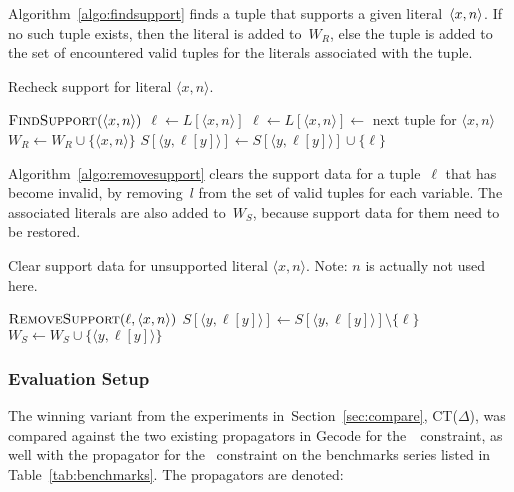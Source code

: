 \documentclass[a4paper,11pt]{article}
\newcommand{\Secref}[1]{Section~\ref{#1}}
\newcommand{\Algoref}[1]{Algorithm~\ref{#1}}
\newcommand{\Table}{\Constraint{Table}}
\newcommand{\Regular}{\Constraint{Regular}}
\newcommand{\FOREACH}[1]{\FORALL{{#1} \textbf{do}}}
\newcommand{\ENDFOREACH}{\ENDFOR}
\def\PROCEDURE{\item[\textbf{PROCEDURE}]}
\def\FindSupport{\textsc{FindSupport}}
\def\RemoveSupport{\textsc{RemoveSupport}}
\numberwithin{equation}{section}
\begin{document}
\begin{description}
\Algoref{algo:findsupport} finds a tuple that supports a given literal~$\left\langle x,n\right\rangle$.
If no such tuple exists, then the literal is added to~$W_R$, else the tuple is added
to the set of encountered valid tuples for the literals associated with the tuple.

\begin{algorithm}[H]
\caption{Recheck support for literal $\langle x,n \rangle$.}
\label{algo:findsupport}
\begin{algorithmic}[1]
  \PROCEDURE $\FindSupport(\langle x,n \rangle)$
  \STATE $\ell \gets L[\langle x,n \rangle]$
    \STATE $\ell \gets L[\langle x,n \rangle] \gets$ next tuple for $\langle x,n \rangle$
  \ENDWHILE
  \IF{$\ell=\bot$}
    \STATE $W_R \gets W_R \cup \{ \langle x,n \rangle\}$
  \ELSE
    \FOREACH{$y \in X$}
      \STATE $S[\langle y,\ell[y] \rangle] \gets S[\langle y,\ell[y] \rangle] \cup \{ \ell \}$
    \ENDFOREACH
  \ENDIF
\end{algorithmic}
\end{algorithm}

\Algoref{algo:removesupport} clears the support data for a tuple~$\ell$ that has
become invalid, by removing~$l$ from the set of valid tuples for each variable.
The associated literals are also added to~$W_S$, because support data for them
need to be restored.
 
\begin{algorithm}
\caption{Clear support data for unsupported literal $\langle x,n
  \rangle$.  Note: $n$ is actually not used here.}
  \label{algo:removesupport}
\begin{algorithmic}[1]
  \PROCEDURE $\RemoveSupport(\ell, \langle x,n \rangle)$
  \FOREACH{$y \in X$}
    \STATE $S[\langle y,\ell[y] \rangle] \gets S[\langle y,\ell[y] \rangle] \setminus \{ \ell \}$
      \STATE $W_S \gets W_S \cup \{ \langle y,\ell[y] \rangle \}$
    \ENDIF
  \ENDFOREACH
\end{algorithmic}
\end{algorithm}

   \end{description}
\clearpage
\subsubsection{Evaluation Setup}
The winning variant from the experiments in~\Secref{sec:compare},
CT($\Delta$), was compared against the two existing propagators
in Gecode for the~\Table~constraint, as well with the propagator
for the \Regular~constraint on the benchmarks series
listed in Table~\ref{tab:benchmarks}. The propagators are
denoted:
\end{document}
